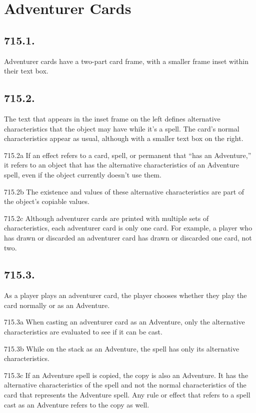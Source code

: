 \section{Adventurer Cards}
\subsection*{715.1.}
Adventurer cards have a two-part card frame, with a smaller frame inset within their text box.

\subsection*{715.2.}
The text that appears in the inset frame on the left defines alternative characteristics that the object may have while it’s a spell. The card’s normal characteristics appear as usual, although with a smaller text box on the right.

715.2a If an effect refers to a card, spell, or permanent that “has an Adventure,” it refers to an object that has the alternative characteristics of an Adventure spell, even if the object currently doesn’t use them.

715.2b The existence and values of these alternative characteristics are part of the object’s copiable values.

715.2c Although adventurer cards are printed with multiple sets of characteristics, each adventurer card is only one card. For example, a player who has drawn or discarded an adventurer card has drawn or discarded one card, not two.

\subsection*{715.3.}
As a player plays an adventurer card, the player chooses whether they play the card normally or as an Adventure.

715.3a When casting an adventurer card as an Adventure, only the alternative characteristics are evaluated to see if it can be cast.

715.3b While on the stack as an Adventure, the spell has only its alternative characteristics.

715.3c If an Adventure spell is copied, the copy is also an Adventure. It has the alternative characteristics of the spell and not the normal characteristics of the card that represents the Adventure spell. Any rule or effect that refers to a spell cast as an Adventure refers to the copy as well.

